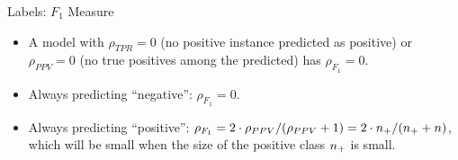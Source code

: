 \documentclass[11pt,compress,t,notes=noshow, xcolor=table]{beamer}
\begin{document}
\begin{vbframe}{Labels: $F_1$ Measure}
\begin{itemize}
  \item A model with $\rho_{TPR} = 0$ (no positive instance predicted as 
  positive) or 
  $\rho_{PPV} = 0$ (no true positives among the predicted) has $\rho_{F_1} = 0$.
  \item Always predicting \enquote{negative}: $\rho_{F_1} = 0$.
  \item Always predicting \enquote{positive}: $\rho_{F_1} = 2 \cdot \rho_{PPV} / 
  (\rho_{PPV} + 1) = 2 \cdot n_{+} / (n_{+} + n)$,\\ 
  which will be small when the size of the positive class $n_{+}$ is small.
\end{itemize}

\end{vbframe}

\end{document}
